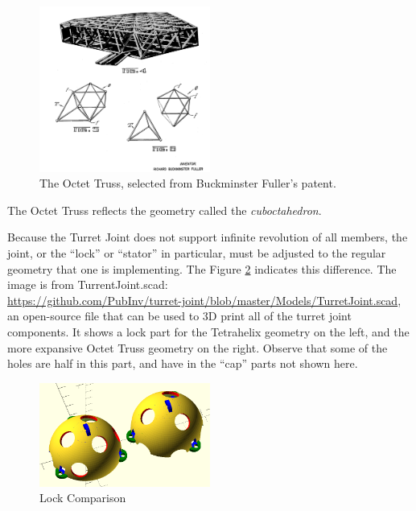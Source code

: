 \documentclass[11pt]{article}
\begin{document}
\begin{figure}[H]
  \centering
    \includegraphics[width=0.5\textwidth]{figures/OctetTrussSelection.png}
    \caption[The Octet Truss]{The Octet Truss, selected from Buckminster Fuller's patent.}
      \label{octet-truss-patent}
\end{figure}

The Octet Truss reflects the geometry called the \emph{cuboctahedron}.

Because the Turret Joint does not support infinite revolution of all members, the joint, or the ``lock'' or ``stator'' in particular,
must be adjusted to the regular geometry that one is implementing.  The Figure \ref{lockcomparison} indicates this difference.
The image is from TurrentJoint.scad:\\
\href{https://github.com/PubInv/turret-joint/blob/master/Models/TurretJoint.scad}{https://github.com/PubInv/turret-joint/blob/master/Models/TurretJoint.scad}, an
open-source file that can be used to 3D print all of the turret joint components.
It shows a lock part for the Tetrahelix geometry
on the left, and the more expansive Octet Truss geometry on the right. Observe that some of the holes are half in this part,
and have in the ``cap'' parts not shown here.

\begin{figure}[H]
  \centering
    \includegraphics[width=0.5\textwidth]{figures/TetrahelixLockVsOctetTrussLock.png}
    \caption[Lock Comparison]{Lock Comparison}
      \label{lockcomparison}
\end{figure}
\end{document}
